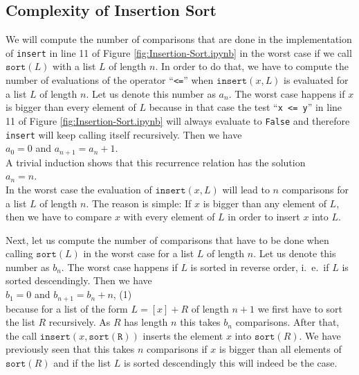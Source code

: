 \subsection{Complexity of Insertion Sort}
We will compute the number of comparisons that are done in the implementation of \texttt{insert}
in line 11 of Figure \ref{fig:Insertion-Sort.ipynb} in the worst case if we call $\texttt{sort}(L)$ with a list $L$ of length $n$. In order to do that,
we have to compute the number of evaluations of the operator ``\texttt{<=}'' when 
 $\texttt{insert}(x,L)$ is evaluated for a list $L$ of length $n$.  Let us denote this number as 
$a_n$.  The worst case happens if $x$ is bigger than every element of $L$ because in that case the
test ``\texttt{x <= y}'' in line 11 of Figure \ref{fig:Insertion-Sort.ipynb} will always evaluate to
\texttt{False} and therefore \texttt{insert} will keep calling itself recursively.
Then we have
\\[0.2cm]
\hspace*{1.3cm}
$a_0 = 0$ \quad and \quad $a_{n+1} = a_n + 1$. 
\\[0.2cm]
A trivial induction shows that this recurrence relation has the solution
\\[0.2cm]
\hspace*{1.3cm} 
$a_n = n$.
\\[0.2cm]
In the worst case the evaluation of $\mathtt{insert}(x,L)$ will lead to $n$ comparisons for a list
$L$ of length $n$.  The reason is simple:  If $x$ is bigger than any element of $L$, then we have to
compare $x$ with every element of $L$ in order to insert $x$ into $L$.

Next, let us compute the number of comparisons that have to be done when calling
$\texttt{sort}(L)$ in the worst case for a list  $L$ of length $n$.  Let us denote this number as
$b_n$. The worst case happens if $L$ is sorted in reverse order, i.~e.~if $L$ is sorted
descendingly.   
Then we have \\[0.2cm]
\hspace*{1.3cm}
 $b_1 = 0$ \quad and \quad $b_{n+1} = b_n + n$, \hspace*{\fill} (1)
\\[0.2cm]
because for a list of the form $L = [x] + R$ of length $n+1$ we first have to sort the list $R$
recursively.  As $R$ has length $n$ this takes $b_n$ comparisons.  After that, the call
$\mathtt{insert}(x, \mathtt{sort(R)})$ 
inserts the element $x$ into $\mathtt{sort}(R)$.  We have previously seen that this takes $n$
comparisons if $x$ is bigger than all elements of $\mathtt{sort}(R)$ and if the list $L$ is sorted
descendingly this will indeed be the case.

